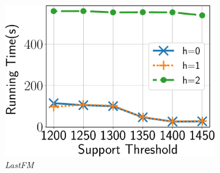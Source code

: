 \begin{figure}

	\begin{subfigure}[b]{0.25\textwidth}
		\includegraphics[keepaspectratio, scale=0.24, angle=0]{img2/lastfm/lastfm_running_time_nobound.pdf}
		\caption{{\em LastFM}}
		\label{fig:lastfm_nosb}
	\end{subfigure}\\
	\begin{subfigure}[b]{0.25\textwidth}

\end{subfigure}
\end{figure}
